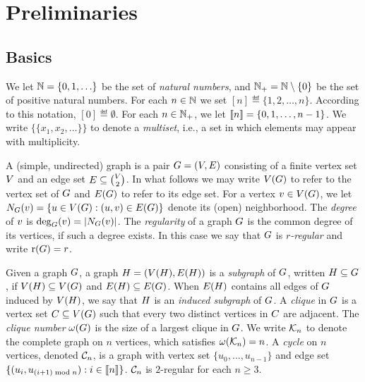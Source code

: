 \section{Preliminaries}



\subsection{Basics}

We let $\mathbb{N} =  \{0,1, \ldots \}$ be the set of {\em natural numbers}, 
and $\mathbb{N}_+= \mathbb{N} \setminus \{0\}$ be the set of positive natural numbers. 
For each $n \in \mathbb{N}$ we set $[n] \eqdef \{1,2, \ldots,n\}$. According to this notation,
$[0] \eqdef \emptyset$. For each $n \in \mathbb{N}_+$, we let $\llbracket n \rrbracket = \{0,1,\ldots,
n-1\}$. We write $\{\!\!\{x_1, x_2, \ldots\}\!\!\}$ to denote a \emph{multiset}, i.e., a set in which elements may appear with multiplicity.


A (simple, undirected) graph is a pair $G = (V,E)$
consisting of a finite vertex set $V$ and an edge set 
$E \subseteq \binom{V}{2}$. In what follows we may write 
$V(G)$ to refer to the vertex set of $G$ and 
$E(G)$ to refer to its edge set. For a vertex 
$v \in V(G)$, we let 
$N_G(v) = \{u \in V(G) : (u,v) \in E(G)\}$
denote its (open) neighborhood. The \emph{degree} of $v$ is 
$\deg_G(v) = |N_G(v)|$.
The \emph{regularity} of a graph $G$ is the common degree of its vertices,
if such a degree exists. In this case we say that $G$ is \emph{$r$-regular}
and write $\mathrm{r}(G) = r$.

Given a graph $G$, a graph $H = (V(H),E(H))$ is a 
\emph{subgraph} of $G$, written $H \subseteq G$, if 
$V(H) \subseteq V(G)$ and 
$E(H) \subseteq E(G)$.
When $E(H)$ contains all edges of $G$ induced by 
$V(H)$, we say that $H$ is an \emph{induced subgraph} of $G$.
A \emph{clique} in $G$ is a vertex set 
$C \subseteq V(G)$ such that every two distinct vertices in $C$ 
are adjacent. The \emph{clique number} $\omega(G)$ is the size of a largest clique in $G$.
We write $\mathcal{K}_n$ to denote the complete graph on $n$ vertices, which satisfies 
$\omega(\mathcal{K}_n) = n$.
A \emph{cycle} on $n$ vertices, denoted $\mathcal{C}_n$, is a graph with vertex set 
$\{u_0,\dots,u_{n-1}\}$ and edge set $\{(u_i,u_{(i+1)\bmod n}) : i \in \llbracket n \rrbracket\}$.
 $\mathcal{C}_n$ is $2$-regular for each $n \ge 3$.

